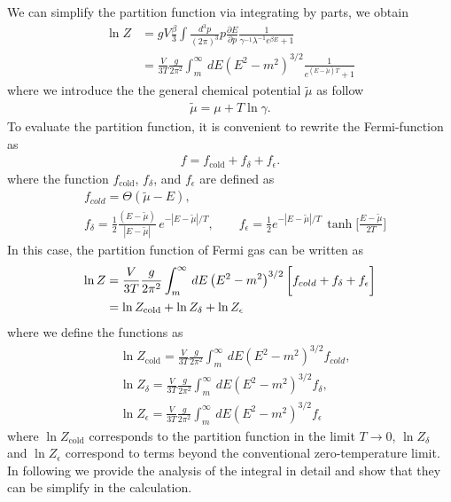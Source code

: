 \documentclass[sn-mathphys,Numbered]{sn-jnl}
\theoremstyle{thmstyleone}%
\theoremstyle{thmstyletwo}%
\theoremstyle{thmstylethree}%
\begin{document}
We can simplify the partition function via integrating by parts, we obtain
\begin{align}
\ln{Z}&=gV\frac{\beta}{3}\int \frac{d^3p}{(2\pi)^3}p\frac{\partial E}{\partial p}\frac{1}{\gamma^{-1}\lambda^{-1}e^{\beta E}+1}\\
&=\frac{V}{3T}\frac{g}{2\pi^2}\int^\infty_m\,dE\left(E^2-m^2\right)^{3/2}\frac{1}{e^{(E-\tilde\mu)T}+1}
\end{align}
where we introduce the the general chemical potential $\tilde\mu$ as follow
\begin{align}
\tilde\mu=\mu+T\ln\gamma.
\end{align}
To evaluate the partition function, it is convenient to rewrite the Fermi-function as 
\begin{align}
f=f_{\mathrm{cold}} +f_\delta+f_\epsilon.
\end{align}
where the function $f_{\mathrm{cold}}$, $f_{\delta}$, and $f_{\epsilon}$ are defined as
\begin{align}
&f_{cold}=\Theta(\tilde\mu-E),\\
&f_{\delta}=\frac{1}{2}\frac{(E-\tilde\mu)}{|E-\tilde\mu|}\,e^{-|E-\tilde\mu|/T},\qquad f_{\epsilon}=\frac{1}{2}e^{-|E-\tilde\mu|/T}\,\tanh\bigg[\frac{E-\tilde\mu}{2T}\bigg]
\end{align}
In this case, the partition function of Fermi gas can be written as
\begin{align}
\ln{Z}&=\frac{V}{3T}\frac{g}{2\pi^2}\int^\infty_m\,dE\left(E^2-m^2\right)^{3/2}\bigg[f_{cold} +f_\delta+f_\epsilon\bigg]\notag\\
&=\ln{Z}_{\mathrm{cold}}+\ln{Z}_\delta+\ln{Z}_\epsilon
\end{align}
where we define the functions as 
\begin{align}
&\ln{Z}_\mathrm{cold}=\frac{V}{3T}\frac{g}{2\pi^2}\int^\infty_m\,dE\left(E^2-m^2\right)^{{3}/{2}}f_{cold},\\
&\ln{Z}_\delta=\frac{V}{3T}\frac{g}{2\pi^2}\int^\infty_m\,dE\left(E^2-m^2\right)^{3/2} f_\delta,\\
&\ln{Z}_\epsilon=\frac{V}{3T}\frac{g}{2\pi^2}\int^\infty_m\,dE\left(E^2-m^2\right)^{3/2}f_\epsilon
\end{align}
where $\ln Z_{\mathrm{cold}}$ corresponds to the partition function in the limit $T\to 0$, $\ln{Z}_\delta$ and $\ln{Z}_\epsilon$ correspond to terms beyond the conventional
zero-temperature limit. In following we provide the analysis of the integral in detail and show that they can be simplify in the calculation.
\end{document}
